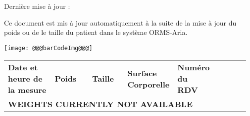 \documentclass[12pt]{article}
\begin{document}
\begin{minipage}{0.65\textwidth}
\hspace{-0.22in} Derni\`{e}re mise \`{a} jour : \textbf{\color{black}{@@@now@@@}}\\
\bigskip

\vspace{-0.22in}
\hspace{-0.22in} Ce document est mis \`{a} jour automatiquement \`{a} la suite de la mise \`{a} jour du poids ou de le taille du patient dans le syst\`{e}me ORMS-Aria.
\end{minipage}
\begin{minipage}{0.25\textwidth}
\begin{flushright}
\texttt{[image: @@@barCodeImg@@@]}
\end{flushright}
\end{minipage}

\begin{center}
\end{center}
\vspace{-0.3in}

\normalsize
{}
{\renewcommand{\arraystretch}{1.5}%
\begin{longtable}
{
    |p{0.2\linewidth}
    |p{0.16\linewidth}
    |p{0.155\linewidth}
    |p{0.15\linewidth}
    |p{0.15\linewidth}
    |p{0.15\linewidth}
    |
}
\hline
\rowcolor{babyblueeyes}
    \textbf{Date et heure de la mesure}
    &\textbf{Poids}
    &\textbf{Taille}
    &\textbf{Surface \newline Corporelle}
    &\textbf{Num\'{e}ro \newline du RDV}\\
\multicolumn{6}{l}{\textbf{WEIGHTS CURRENTLY NOT AVAILABLE}}\\
\hline
\endhead
\hline
\hline

\end{longtable}}

\end{document}
